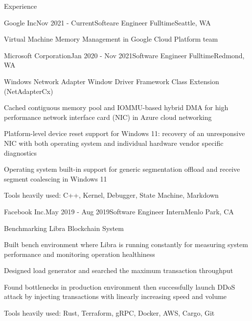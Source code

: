 \documentclass{resume} %
\begin{document}
\begin{rSection}{Experience}

\begin{rSubsection}{Google Inc}{Nov 2021 - Current}{Softeare Engineer Fulltime}{Seattle, WA}
\item Virtual Machine Memory Management in Google Cloud Platform team
\end{rSubsection}

\begin{rSubsection}{Microsoft Corporation}{Jan 2020 - Nov 2021}{Software Engineer Fulltime}{Redmond, WA}
\item Windows Network Adapter Window Driver Framework Class Extension (NetAdapterCx)
\item Cached contiguous memory pool and IOMMU-based hybrid DMA for high performance network interface card (NIC) in Azure cloud networking
\item Platform-level device reset support for Windows 11: recovery of an unresponsive NIC with both operating system and individual hardware vendor specific diagnostics
\item Operating system built-in support for generic segmentation offload and receive segment coalescing in Windows 11
\item Tools heavily used: C++, Kernel, Debugger, State Machine, Markdown
\end{rSubsection}

\begin{rSubsection}{Facebook Inc.}{May 2019 - Aug 2019}{Software Engineer Intern}{Menlo Park, CA}
\item Benchmarking Libra Blockchain System 
\item Built bench environment where Libra is running constantly for measuring system performance and monitoring operation healthiness
\item Designed load generator and searched the maximum transaction throughput
\item Found bottlenecks in production environment then successfully launch DDoS attack by injecting transactions with linearly increasing speed and volume
\item Tools heavily used: Rust, Terraform, gRPC, Docker, AWS, Cargo, Git
\end{rSubsection}


\end{rSection}
\end{document}
